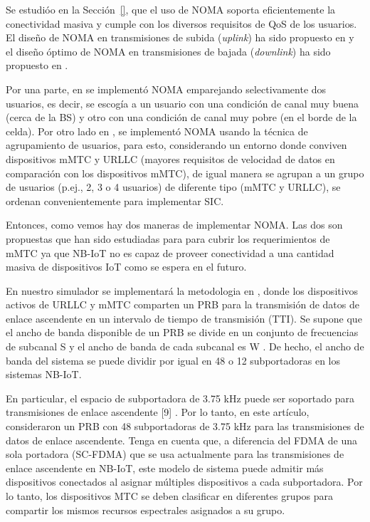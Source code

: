 Se estudióo en la Sección~\ref{}, que el uso de NOMA soporta eficientemente la conectividad masiva y cumple con los diversos requisitos de QoS de los usuarios. El diseño de NOMA en transmisiones de subida (\textit{uplink}) ha sido propuesto en \parencite{Al-Imari2014} y el diseño óptimo de NOMA en transmisiones de bajada (\textit{downlink}) ha sido propuesto en \parencite{Zhu2019}.

Por una parte, en \parencite{Zhang2017} se implementó NOMA emparejando selectivamente dos usuarios, es decir, se escogía a un usuario con una condición de canal muy buena (cerca de la BS) y otro con una condición de canal muy pobre (en el borde de la celda). Por otro lado en \parencite{Shahini2019}, se implementó NOMA usando la técnica de agrupamiento de usuarios, para esto, considerando un entorno donde conviven dispositivos mMTC y URLLC (mayores requisitos de velocidad de datos en comparación con los dispositivos mMTC), de igual manera se agrupan a un grupo de usuarios (p.ej., 2, 3 o 4 usuarios) de diferente tipo (mMTC y URLLC), se ordenan convenientemente para implementar SIC.

Entonces, como vemos hay dos maneras de implementar NOMA. Las dos son propuestas que han sido estudiadas para para cubrir los requerimientos de mMTC ya que NB-IoT no es capaz de proveer conectividad a una cantidad masiva de dispositivos IoT como se espera en el futuro.

En nuestro simulador se implementará la metodologia en \parencite{Shahini2019}, donde los dispositivos activos de URLLC y mMTC comparten un PRB para la transmisión de datos de enlace ascendente en un intervalo de tiempo de transmisión (TTI). Se supone que el ancho de banda disponible de un PRB se divide en un conjunto de frecuencias de subcanal S y el ancho de banda de cada subcanal es W . De hecho, el ancho de banda del sistema se puede dividir por igual en 48 o 12 subportadoras en los sistemas NB-IoT.\newline

En particular, el espacio de subportadora de 3.75 kHz puede ser soportado para transmisiones de enlace ascendente [9] . Por lo tanto, en este artículo, consideraron un PRB con 48 subportadoras de 3.75 kHz para las transmisiones de datos de enlace ascendente. Tenga en cuenta que, a diferencia del FDMA de una sola portadora (SC-FDMA) que se usa actualmente para las transmisiones de enlace ascendente en NB-IoT, este modelo de sistema puede admitir más dispositivos conectados al asignar múltiples dispositivos a cada subportadora. Por lo tanto, los dispositivos MTC se deben clasificar en diferentes grupos para compartir los mismos recursos espectrales asignados a su grupo.\newline


